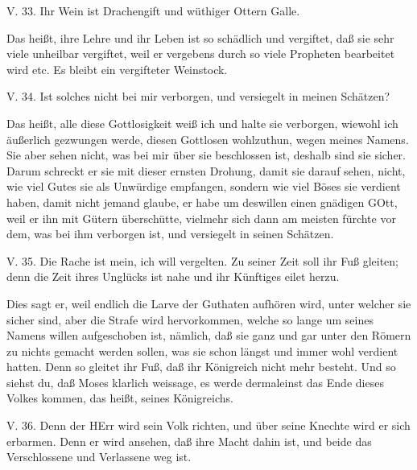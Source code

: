 \begin{schriftzitat}
V. 33. Ihr Wein ist Drachengift und wüthiger Ottern Galle.
\end{schriftzitat}

Das heißt, ihre Lehre und ihr Leben ist so schädlich und vergiftet, daß sie sehr viele unheilbar vergiftet, weil er vergebens durch so viele Propheten bearbeitet wird etc. Es bleibt ein vergifteter Weinstock.

\begin{schriftzitat}
V. 34. Ist solches nicht bei mir verborgen, und versiegelt in meinen Schätzen?
\end{schriftzitat}

Das heißt, alle diese Gottlosigkeit weiß ich und halte sie verborgen, wiewohl ich äußerlich gezwungen werde, diesen Gottlosen wohlzuthun, wegen meines Namens. Sie aber sehen nicht, was bei mir über sie beschlossen ist, deshalb sind sie sicher. Darum schreckt er sie mit dieser ernsten Drohung, damit sie darauf sehen, nicht, wie viel Gutes sie als Unwürdige empfangen, sondern wie viel Böses sie verdient haben, damit nicht jemand glaube, er habe um deswillen einen gnädigen GOtt, weil er ihn mit Gütern überschütte, vielmehr sich dann am meisten fürchte vor dem, was bei ihm verborgen ist, und versiegelt in seinen Schätzen.

\begin{schriftzitat}
V. 35. Die Rache ist mein, ich will vergelten. Zu seiner Zeit soll ihr Fuß gleiten; denn die Zeit ihres Unglücks ist nahe und ihr Künftiges eilet herzu.
\end{schriftzitat}

Dies sagt er, weil endlich die Larve der Guthaten aufhören wird, unter welcher sie sicher sind, aber die Strafe wird hervorkommen, welche so lange um seines Namens willen aufgeschoben ist, nämlich, daß sie ganz und gar unter den Römern zu nichts gemacht werden sollen, was sie schon längst und immer wohl verdient hatten. Denn so gleitet ihr Fuß, daß ihr Königreich nicht mehr besteht. Und so siehst du, daß Moses klarlich weissage, es werde dermaleinst das Ende dieses Volkes kommen, das heißt, seines Königreichs.

\begin{schriftzitat}
V. 36. Denn der HErr wird sein Volk richten, und über seine Knechte wird er sich erbarmen. Denn er wird ansehen, daß ihre Macht dahin ist, und beide das Verschlossene und Verlassene weg ist.
\end{schriftzitat}

